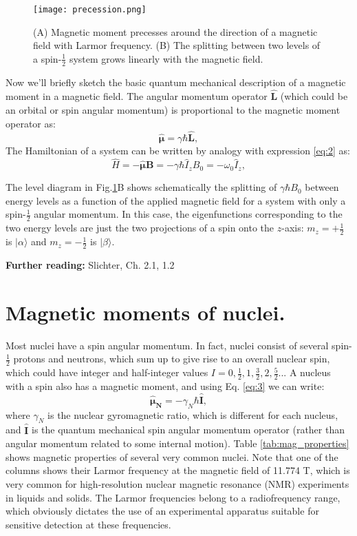 \documentclass[a4paper, 12pt]{article}
\begin{document}
\begin{figure}[ht]
\caption{(A) Magnetic moment precesses around the direction of a magnetic field with Larmor frequency. (B) The splitting between two levels of a spin-$\frac{1}{2}$ system grows linearly with the magnetic field.}
\label{fig:precession}
\centering
\texttt{[image: precession.png]}
\end{figure}

Now we'll briefly sketch the basic quantum mechanical description of a magnetic moment in a magnetic field.  The angular momentum operator $\bm{\hat{L}}$ (which could be an orbital or spin angular momentum) is proportional to the magnetic moment operator as:
\begin{equation} \label{eq:3}
\bm{\hat{\mu}} = \gamma \hbar \bm{\hat{L}},
\end{equation}
The Hamiltonian of a system can be written by analogy with expression \ref{eq:2} as:
\begin{equation} \label{eq:2level}
\hat{H} = -\bm{\hat{\mu}} \bm{B} = -\gamma \hbar \hat{I}_{z} B_0 = -\omega_0 \hat{I}_{z},
\end{equation}

The level diagram in Fig.\ref{fig:precession}B shows schematically the splitting of $\gamma \hbar B_0 $ between energy levels  as a function of the applied magnetic field for a system with only a spin-$\frac{1}{2}$ angular momentum. In this case, the eigenfunctions corresponding to the two energy levels are just the two projections of a spin onto the $z$-axis: $m_z=+\frac{1}{2}$ is $\vert \alpha \rangle$ and $m_z=-\frac{1}{2}$ is $\vert \beta \rangle$.

\textbf{Further reading:} Slichter, Ch. 2.1, 1.2 

\section{Magnetic moments of nuclei.}
Most nuclei have a spin angular momentum. In fact, nuclei consist of several spin-$\frac{1}{2}$ protons and neutrons, which sum up to give rise to an overall nuclear spin, which could have integer and half-integer values $I=0, \frac{1}{2}, 1, \frac{3}{2}, 2, \frac{5}{2}...$ A nucleus with a spin also has a magnetic moment, and using  Eq. \ref{eq:3} we can write:
\begin{equation}
\bm{\hat{\mu}_N} = -\gamma_N \hbar \bm{\hat{I}},
\end{equation}
where $\gamma_N$ is the nuclear gyromagnetic ratio, which is different for each nucleus, and $\bm{\hat{I}}$ is the quantum mechanical spin angular momentum operator (rather than angular momentum related to some internal motion). Table \ref{tab:mag_properties} shows magnetic properties of several very common nuclei. Note that one of the columns shows their Larmor frequency at the magnetic field of 11.774 T, which is very common for high-resolution nuclear magnetic resonance (NMR) experiments in liquids and solids. The Larmor frequencies belong to a radiofrequency range, which obviously dictates the use of an experimental apparatus suitable for sensitive detection at these frequencies. 
\end{document}
